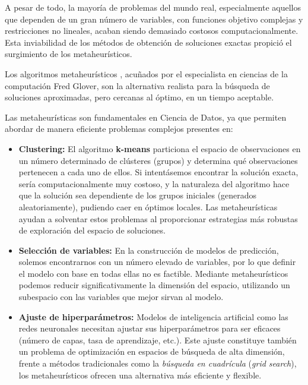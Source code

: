 \documentclass[12pt,a4paper]{book}
\begin{document}
A pesar de todo, la mayoría de problemas del mundo real, especialmente aquellos que dependen de un gran número de variables, con funciones objetivo complejas y restricciones no lineales, acaban siendo demasiado costosos computacionalmente. Esta inviabilidad de los métodos de obtención de soluciones exactas propició el surgimiento de los metaheurísticos.

Los algoritmos metaheurísticos \cite{metaheuristicos}, acuñados por el especialista en ciencias de la computación Fred Glover,
son la alternativa realista para la búsqueda de soluciones aproximadas, pero cercanas al óptimo, en un tiempo aceptable.

Las metaheurísticas son fundamentales en Ciencia de Datos, ya que permiten abordar de manera eficiente problemas complejos presentes en:

\begin{itemize}
    \item \textbf{Clustering:} El algoritmo \textbf{k-means} particiona el espacio de observaciones en un número determinado de clústeres (grupos) y determina qué observaciones pertenecen a cada uno de ellos. 
    Si intentásemos encontrar la solución exacta, sería computacionalmente muy costoso, y la naturaleza del algoritmo hace que la solución sea dependiente de los grupos iniciales (generados aleatoriamente), pudiendo caer en óptimos locales.
    Las metaheurísticas ayudan a solventar estos problemas al proporcionar estrategias más robustas de exploración del espacio de soluciones.
    
    \item \textbf{Selección de variables:} En la construcción de modelos de predicción, solemos encontrarnos con un número elevado de variables, por lo que definir el modelo con base en todas ellas no es factible. Mediante metaheurísticos podemos 
    reducir significativamente la dimensión del espacio, utilizando un subespacio con las variables que mejor sirvan al modelo.
    
    \item \textbf{Ajuste de hiperparámetros:} Modelos de inteligencia artificial como las redes neuronales necesitan ajustar sus hiperparámetros para ser eficaces (número de capas, tasa de aprendizaje, etc.). Este ajuste constituye también un problema de optimización en espacios de búsqueda de alta dimensión, frente a métodos tradicionales como la \textit{búsqueda en cuadrícula} (\textit{grid search}), los metaheurísticos ofrecen una alternativa más eficiente y flexible.
\end{itemize}
\end{document}

